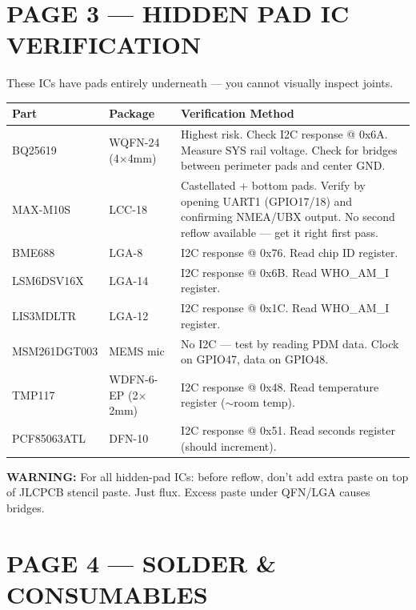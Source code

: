 \documentclass[11pt,a4paper]{article}
\newcommand{\dangerbox}[1]{\par\noindent\colorbox{danger!10}{\parbox{\dimexpr\textwidth-2\fboxsep}{%
\textcolor{danger}{\textbf{WARNING:}} #1}}\par\vspace{0.5em}}
\begin{document}
\newpage
\section*{PAGE 3 — HIDDEN PAD IC VERIFICATION}

These ICs have pads entirely underneath — you cannot visually inspect joints.

\begin{table}[H]
\centering
\renewcommand{\arraystretch}{1.3}
\begin{tabular}{@{}p{3.2cm}p{3cm}p{8cm}@{}}
\toprule
\textbf{Part} & \textbf{Package} & \textbf{Verification Method} \\
\midrule
BQ25619 & WQFN-24 (4$\times$4mm) & Highest risk. Check I2C response @ 0x6A. Measure SYS rail voltage. Check for bridges between perimeter pads and center GND. \\
MAX-M10S & LCC-18 & Castellated + bottom pads. Verify by opening UART1 (GPIO17/18) and confirming NMEA/UBX output. No second reflow available — get it right first pass. \\
BME688 & LGA-8 & I2C response @ 0x76. Read chip ID register. \\
LSM6DSV16X & LGA-14 & I2C response @ 0x6B. Read WHO\_AM\_I register. \\
LIS3MDLTR & LGA-12 & I2C response @ 0x1C. Read WHO\_AM\_I register. \\
MSM261DGT003 & MEMS mic & No I2C — test by reading PDM data. Clock on GPIO47, data on GPIO48. \\
TMP117 & WDFN-6-EP (2$\times$2mm) & I2C response @ 0x48. Read temperature register ($\sim$room temp). \\
PCF85063ATL & DFN-10 & I2C response @ 0x51. Read seconds register (should increment). \\
\bottomrule
\end{tabular}
\end{table}

\dangerbox{For all hidden-pad ICs: before reflow, don't add extra paste on top of JLCPCB stencil paste. Just flux. Excess paste under QFN/LGA causes bridges.}

\newpage
\section*{PAGE 4 — SOLDER \& CONSUMABLES}
\end{document}
